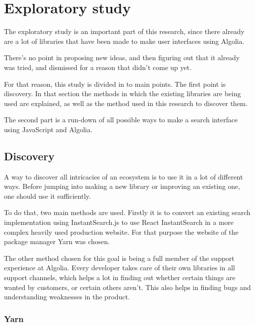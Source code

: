 
\chapter{Exploratory study} %
\label{chp:exploratory_study}

The exploratory study is an important part of this research, since there already are a lot of libraries that have been made to make user interfaces using Algolia.

There's no point in proposing new ideas, and then figuring out that it already was tried, and dismissed for a reason that didn't come up yet. 

For that reason, this study is divided in to main points. The first point is discovery. In that section the methods in which the existing libraries are being used are explained, as well as the method used in this research to discover them. 

The second part is a run-down of all possible ways to make a search interface using JavaScript and Algolia. 

\section{Discovery}
\label{sec:discovery}

A way to discover all intricacies of an ecosystem is to use it in a lot of different ways. Before jumping into making a new \gls{library} or improving an existing one, one should use it sufficiently.

To do that, two main methods are used. Firstly it is to convert an existing search implementation using InstantSearch.js\cite{instantsearch-js} to use React InstantSearch in a more complex heavily used production website. For that purpose the website of the package manager Yarn\cite{yarn-site} was chosen.

The other method chosen for this goal is being a full member of the support experience at Algolia. Every developer takes care of their own libraries in all support channels, which helps a lot in finding out whether certain things are wanted by customers, or certain others aren't. This also helps in finding bugs and understanding weaknesses in the product.

\subsection{Yarn} %
\label{ssec:yarn}

